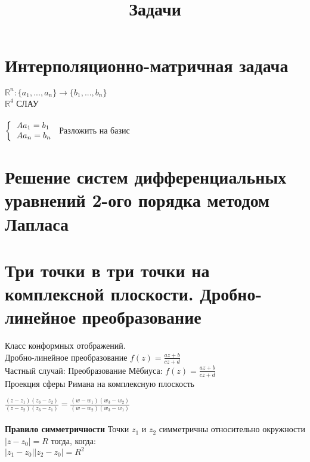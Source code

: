 \documentclass[12pt]{article}
\author{}
\begin{document}
\title{Задачи}
\date{}
\maketitle

\section{Интерполяционно-матричная задача}
$\mathbb{R}^n: \{a_1, ..., a_n\} \rightarrow \{b_1, ..., b_n\}$ \\
$\mathbb{R}^4$ СЛАУ \\\\
$
\bigg\{ 
  \begin{tabular}{l}
    \( A a_1 = b_1 \) \\
    \( A a_n = b_n \) \\
  \end{tabular}
$
Разложить на базис

\section{Решение систем дифференциальных уравнений 2-ого порядка методом Лапласа}
\section{Три точки в три точки на комплексной плоскости. Дробно-линейное преобразование}
Класс конформных отображений. \\
Дробно-линейное преобразование
$f(z) = \frac{az + b}{cz + d}$
\\
Частный случай: Преобразование Мёбиуса:
$f(z) = \frac{az + b}{cz + d}$\\
Проекция сферы Римана на комплексную плоскость

$
  \frac{(z - z_1)(z_3 - z_2)}{(z - z_2)(z_3 - z_1)} = 
  \frac{(w - w_1)(w_3 - w_2)}{(w - w_2)(w_3 - w_1)}
$
\\\\
\textbf{Правило симметричности}
Точки $z_1$ и $z_2$ симметричны относительно окружности $|z - z_0| = R$ тогда, когда:\\
$|z_1 - z_0||z_2 - z_0| = R^2$
\end{document}
